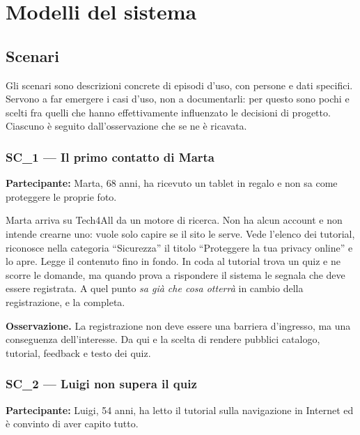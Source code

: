 \chapter{Modelli del sistema}
\label{cap:rad-modelli}

\section{Scenari}
\label{sec:rad-scenari}

Gli scenari sono descrizioni concrete di episodi d'uso, con persone e dati
specifici. Servono a far emergere i casi d'uso, non a documentarli: per
questo sono pochi e scelti fra quelli che hanno effettivamente influenzato le
decisioni di progetto. Ciascuno è seguito dall'osservazione che se ne è
ricavata.

\subsection{SC\_1 — Il primo contatto di Marta}

\begin{nota}
\textbf{Partecipante:} Marta, 68 anni, ha ricevuto un tablet in regalo e non
sa come proteggere le proprie foto.
\end{nota}

Marta arriva su Tech4All da un motore di ricerca. Non ha alcun account e non
intende crearne uno: vuole solo capire se il sito le serve. Vede l'elenco dei
tutorial, riconosce nella categoria \enquote{Sicurezza} il titolo
\enquote{Proteggere la tua privacy online} e lo apre. Legge il contenuto fino
in fondo. In coda al tutorial trova un quiz e ne scorre le domande, ma quando
prova a rispondere il sistema le segnala che deve essere registrata. A quel
punto \emph{sa già che cosa otterrà} in cambio della registrazione, e la
completa.

\textbf{Osservazione.} La registrazione non deve essere una barriera
d'ingresso, ma una conseguenza dell'interesse. Da qui  e la scelta
di rendere pubblici catalogo, tutorial, feedback e testo dei quiz.

\subsection{SC\_2 — Luigi non supera il quiz}

\begin{nota}
\textbf{Partecipante:} Luigi, 54 anni, ha letto il tutorial sulla navigazione
in Internet ed è convinto di aver capito tutto.
\end{nota}

